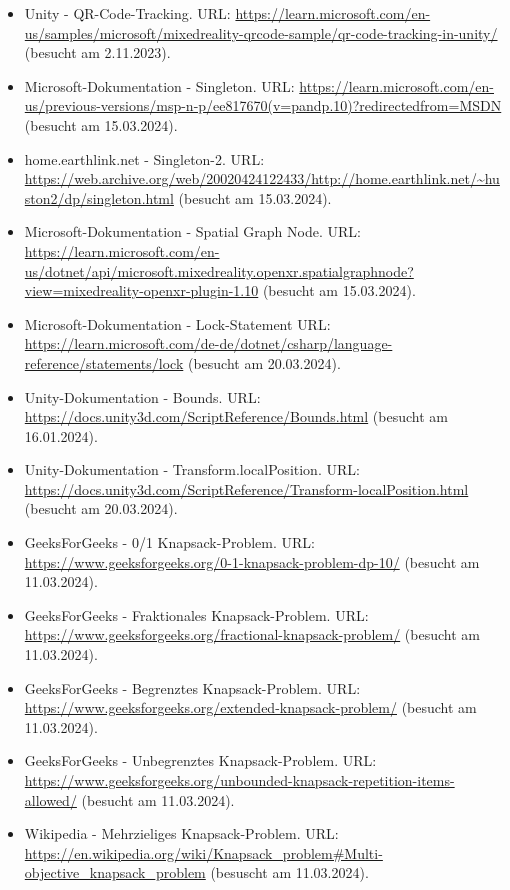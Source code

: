 \begin{itemize}[leftmargin=0pt]
    \item Unity - QR-Code-Tracking. {\scriptsize URL:} \url{https://learn.microsoft.com/en-us/samples/microsoft/mixedreality-qrcode-sample/qr-code-tracking-in-unity/} (besucht am 2.11.2023).
    \item Microsoft-Dokumentation - Singleton. {\scriptsize URL:} \url{https://learn.microsoft.com/en-us/previous-versions/msp-n-p/ee817670(v=pandp.10)?redirectedfrom=MSDN} (besucht am 15.03.2024).
    \item home.earthlink.net - Singleton-2. {\scriptsize URL:} \url{https://web.archive.org/web/20020424122433/http://home.earthlink.net/~huston2/dp/singleton.html} (besucht am 15.03.2024).
    \item Microsoft-Dokumentation - Spatial Graph Node. {\scriptsize URL:} \url{https://learn.microsoft.com/en-us/dotnet/api/microsoft.mixedreality.openxr.spatialgraphnode?view=mixedreality-openxr-plugin-1.10} (besucht am 15.03.2024).
    \item Microsoft-Dokumentation - Lock-Statement {\scriptsize URL:} \url{https://learn.microsoft.com/de-de/dotnet/csharp/language-reference/statements/lock} (besucht am 20.03.2024).
    \item Unity-Dokumentation - Bounds. {\scriptsize URL:} \url{https://docs.unity3d.com/ScriptReference/Bounds.html} (besucht am 16.01.2024).
    \item Unity-Dokumentation - Transform.localPosition. {\scriptsize URL:} \url{https://docs.unity3d.com/ScriptReference/Transform-localPosition.html} (besucht am 20.03.2024).
    \item GeeksForGeeks - 0/1 Knapsack-Problem. {\scriptsize URL:} \url{https://www.geeksforgeeks.org/0-1-knapsack-problem-dp-10/} (besucht am 11.03.2024).
    \item GeeksForGeeks - Fraktionales Knapsack-Problem. {\scriptsize URL:} \url{https://www.geeksforgeeks.org/fractional-knapsack-problem/} (besucht am 11.03.2024).
    \item GeeksForGeeks - Begrenztes Knapsack-Problem. {\scriptsize URL:} \url{https://www.geeksforgeeks.org/extended-knapsack-problem/} (besucht am 11.03.2024).
    \item GeeksForGeeks - Unbegrenztes Knapsack-Problem. {\scriptsize URL:} \url{https://www.geeksforgeeks.org/unbounded-knapsack-repetition-items-allowed/} (besucht am 11.03.2024).
    \item Wikipedia - Mehrzieliges Knapsack-Problem. {\scriptsize URL:} \url{https://en.wikipedia.org/wiki/Knapsack_problem#Multi-objective_knapsack_problem} (besuscht am 11.03.2024).

\end{itemize}
